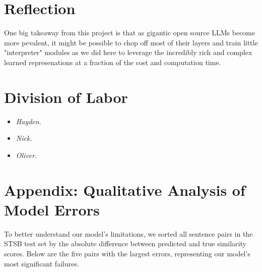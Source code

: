 \documentclass[14pt]{article}
\begin{document}
\section{Reflection}

One big takeaway from this project is that as gigantic open source LLMs become more pevalent, it might be possible to chop off most of their layers and train little "interpreter" modules as we did here to leverage the incredibly rich and complex learned represenations at a fraction of the cost and computation time.

\section{Division of Labor}
\begin{itemize}
    \item \textit{Hayden.}
    \item \textit{Nick.} 
    \item \textit{Oliver.} 
\end{itemize}

\newpage
\section{Appendix: Qualitative Analysis of Model Errors} \label{error analysis}
To better understand our model's limitations, we sorted all sentence pairs in the STSB test set by the absolute difference between predicted and true similarity scores. Below are the five pairs with the largest errors, representing our model's most significant failures.
\end{document}
